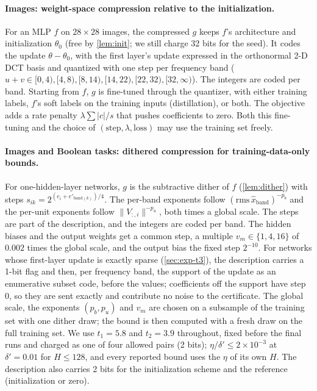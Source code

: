\paragraph{Images: weight-space compression relative to the initialization.} For an MLP $f$ on $28\times28$ images, the compressed $g$ keeps $f$'s architecture and initialization $\theta_0$ (free by \cref{lem:init}; we still charge 32 bits for the seed). It codes the update $\theta-\theta_0$, with the first layer's update expressed in the orthonormal 2-D DCT basis and quantized with one step per frequency band ($u+v\in[0,4),[4,8),[8,14),[14,22),[22,32),[32,\infty)$). The integers are coded per band. Starting from $f$, $g$ is fine-tuned through the quantizer, with either training labels, $f$'s soft labels on the training inputs (distillation), or both. The objective adds a rate penalty $\lambda\sum|c|/s$ that pushes coefficients to zero. Both this fine-tuning and the choice of $(\text{step},\lambda,\text{loss})$ may use the training set freely.

\paragraph{Images and Boolean tasks: dithered compression for training-data-only bounds.} For one-hidden-layer networks, $g$ is the subtractive dither of $f$ (\cref{lem:dither}) with steps $s_{ik}=2^{(e_i+e'_{\mathrm{band}(k)})/4}$. The per-band exponents follow $(\mathrm{rms}\,\hat x_{\mathrm{band}})^{-p_b}$ and the per-unit exponents follow $\|V_{:,i}\|^{-p_u}$, both times a global scale. The steps are part of the description, and the integers are coded per band. The hidden biases and the output weights get a common step, a multiple $v_m\in\{1,4,16\}$ of $0.002$ times the global scale, and the output bias the fixed step $2^{-10}$. For networks whose first-layer update is exactly sparse (\cref{sec:exp-t3}), the description carries a 1-bit flag and then, per frequency band, the support of the update as an enumerative subset code, before the values; coefficients off the support have step 0, so they are sent exactly and contribute no noise to the certificate. The global scale, the exponents $(p_b,p_u)$ and $v_m$ are chosen on a subsample of the training set with one dither draw; the bound is then computed with a fresh draw on the full training set. We use $t_1=5.8$ and $t_2=3.9$ throughout, fixed before the final runs and charged as one of four allowed pairs (2 bits); $\eta/\delta'\le2\times10^{-3}$ at $\delta'=0.01$ for $H\le128$, and every reported bound uses the $\eta$ of its own $H$. The description also carries 2 bits for the initialization scheme and the reference (initialization or zero).

